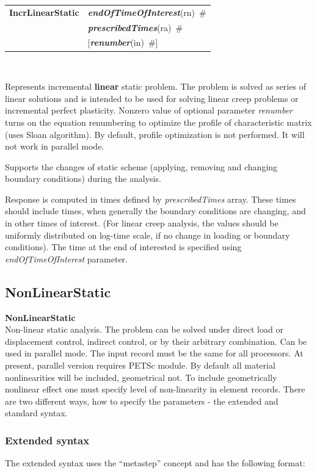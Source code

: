 \documentclass[a4paper]{article}
\makeatletter
\newcommand{\param}[1]{{\em #1}}
\newcommand{\keywordnotype}[1]{\mbox{{\it{\bf{#1}}}}}
\newcommand{\keyword}[2]{\mbox{{\keywordnotype{#1}\tiny (#2)}}}
\newcommand{\entKeywordInst}[1]{\mbox{{\bf{{#1}}}}}
\newcommand{\field}[2]{\mbox{\keyword{#1}{#2}~\#}}
\newcommand{\optField}[2]{\mbox{[\field{#1}{#2}]}}
\newcommand{\Pmode}[1]{{\sffamily #1}}
\newenvironment{record}[1][]{\begin{tabular}{|ll}}{\end{tabular}\\}
\newcommand{\recentry}[2]{{#1}&{#2}\\}
\newcounter{rcc}
\newenvironment{record}[1][\textwidth]{\setcounter{rcc}{0}\begin{tabular*}{#1}{|ll@{\extracolsep{\fill}}r}}{\end{tabular*}\\}
\newcommand{\recentry}[2]{\ifthenelse{\value{rcc}>0}{&$\backslash$ \\}{\setcounter{rcc}{1}}{#1}&{#2}}
\makeatother
\begin{document}
\begin{record}
\recentry{\entKeywordInst{IncrLinearStatic}}{\field{endOfTimeOfInterest}{rn}}
\recentry{}{\field{pre\-scri\-bed\-Ti\-mes}{ra}}
\recentry{}{\optField{renumber}{in}}
\end{record}


Represents incremental {\bf linear} static problem.
The problem is solved as series of linear solutions and is intended to 
be used for solving linear creep problems or incremental perfect plasticity.
Nonzero value of optional parameter \param{renumber} turns on the
equation renumbering to optimize the profile of characteristic matrix
(uses Sloan algorithm). By default, profile optimization is not
performed. It will not work in parallel mode.

Supports the changes of static scheme (applying, removing and changing  boundary conditions) 
during the analysis.

Response is computed in times defined by \param{pre\-scri\-bed\-Ti\-mes}
array. These times should include times, when generally the  boundary
conditions are changing, and in other times of interest. (For linear creep
analysis, the values should be uniformly distributed on log-time scale, if no change in
loading or boundary conditions). The time at the end of interested is
specified using \param{endOfTimeOfInterest} parameter.

\subsection{NonLinearStatic}
\label{NonLinearStatic}
\entKeywordInst{NonLinearStatic} \\
Non-linear static analysis. The problem can be solved under 
direct load or displacement control, indirect control, or by
their arbitrary combination.
\Pmode{Can be used in parallel mode. The input record must be the same
for all processors. At present, parallel version requires PETSc module.}
By default all
material nonlinearities will be included, geometrical not. 
To include geometrically nonlinear effect one must specify
level of non-linearity in element records.
There are two different ways, how to specify the parameters - the
extended and standard syntax. 
\subsubsection{Extended syntax}
The extended syntax uses the ``metastep'' concept and has the
following format:
\end{document}
